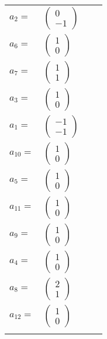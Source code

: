 \documentclass[1p]{elsarticle_modified}
\theoremstyle{definition}
\begin{document}
\begin{tabular}{m{7pt} m{180pt} m{7pt} m{180pt} }
\flushright $a_{2}=$&$\begin{pmatrix}0\\-1\end{pmatrix}$ \\
\flushright $a_{6}=$&$\begin{pmatrix}1\\0\end{pmatrix}$ \\
\flushright $a_{7}=$&$\begin{pmatrix}1\\1\end{pmatrix}$ \\
\flushright $a_{3}=$&$\begin{pmatrix}1\\0\end{pmatrix}$ \\
\flushright $a_{1}=$&$\begin{pmatrix}-1\\-1\end{pmatrix}$ \\
\flushright $a_{10}=$&$\begin{pmatrix}1\\0\end{pmatrix}$ \\
\flushright $a_{5}=$&$\begin{pmatrix}1\\0\end{pmatrix}$ \\
\flushright $a_{11}=$&$\begin{pmatrix}1\\0\end{pmatrix}$ \\
\flushright $a_{9}=$&$\begin{pmatrix}1\\0\end{pmatrix}$ \\
\flushright $a_{4}=$&$\begin{pmatrix}1\\0\end{pmatrix}$ \\
\flushright $a_{8}=$&$\begin{pmatrix}2\\1\end{pmatrix}$ \\
\flushright $a_{12}=$&$\begin{pmatrix}1\\0\end{pmatrix}$\\&\end{tabular}
\end{document}

